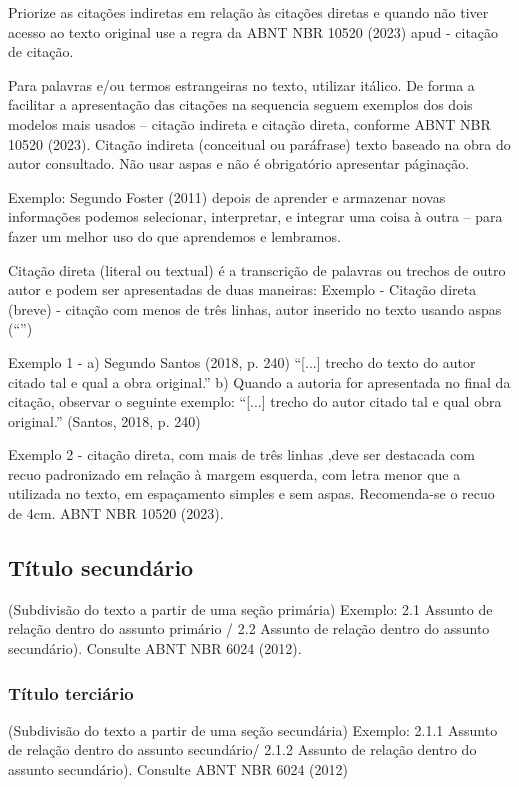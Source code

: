 \documentclass[
article,			%
11pt,				%
twoside,			%
a4paper,			%
section=TITLE,		%
onecolumn,          %
english,			%
brazil,				%
sumario=tradicional
]{abntex2}
\begin{document}
Priorize as citações indiretas em relação às citações diretas e quando não tiver acesso ao texto original use a regra da ABNT NBR 10520 (2023) apud - citação de citação.

Para palavras e/ou termos estrangeiras no texto, utilizar itálico. 
De forma a facilitar a apresentação das citações na sequencia seguem exemplos dos dois modelos mais usados – citação indireta e citação direta, conforme ABNT NBR 10520 (2023).
Citação indireta  (conceitual ou paráfrase) texto baseado na obra do autor consultado. Não usar aspas e não é obrigatório apresentar páginação.

Exemplo:  Segundo Foster (2011) depois de aprender e armazenar novas informações podemos selecionar, interpretar, e integrar uma coisa à outra – para fazer um melhor uso do que aprendemos e lembramos.

Citação direta (literal ou textual) é a transcrição de palavras ou trechos de outro autor e podem ser apresentadas de duas maneiras:
Exemplo - Citação direta (breve) - citação com menos de três linhas, autor inserido no texto usando aspas (“”)

Exemplo 1 - a) Segundo Santos (2018, p. 240) “[...] trecho do texto do autor citado tal e qual a obra original.” b) Quando a autoria for apresentada no final da citação, observar o seguinte exemplo: “[...] trecho do autor citado tal e qual obra original.” (Santos, 2018, p. 240)

Exemplo 2 -  citação direta, com mais de três linhas ,deve ser destacada com recuo padronizado em relação à margem esquerda, com letra menor que a utilizada no texto, em espaçamento simples e sem aspas. Recomenda-se o recuo de 4cm. ABNT NBR 10520 (2023).
    
    \begin{citacao}
        \lipsum[2]
    \end{citacao}
    
    \lipsum[3]

    
    \subsection{Título secundário}
    
  (Subdivisão do texto a partir de uma seção primária) Exemplo: 2.1 Assunto de relação dentro do assunto primário / 2.2 Assunto de relação dentro do assunto secundário). Consulte ABNT NBR 6024 (2012).

  \subsubsection{Título terciário}
(Subdivisão do texto a partir de uma seção secundária) 
Exemplo: 2.1.1 Assunto de relação dentro do assunto secundário/ 2.1.2 Assunto de relação dentro do assunto secundário). Consulte ABNT NBR 6024 (2012)
\end{document}
